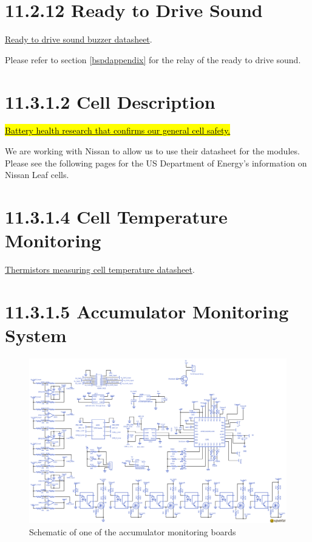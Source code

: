 \documentclass{article}
\DeclareRobustCommand{\hlr}[1]{{\sethlcolor{red}\hl{#1}}}
\begin{document}
{\section*{11.2.12 Ready to Drive Sound} \label{r2dappendix}

\href{http://www.mouser.com/ds/2/252/SC648ANR-63353.pdf}{Ready to drive sound buzzer datasheet}.

Please refer to section \ref{bspdappendix} for the relay of the ready to drive sound.

\section*{11.3.1.2 Cell Description}
\href{http://batteryuniversity.com/learn/article/discharge_methods}{\hlr{Battery health research that confirms our general cell safety.}}

We are working with Nissan to allow us to use their datasheet for the modules. Please see the following pages for the US Department of Energy's information on Nissan Leaf cells.



\section*{11.3.1.4 Cell Temperature Monitoring}

\href{http://media.digikey.com/PDF/Data\%20Sheets/Ametherm\%20PDFs/PANR\%20103395-408.pdf}{Thermistors measuring cell temperature datasheet}.

\section*{11.3.1.5 Accumulator Monitoring System}  \label{amsappendix}

\begin{figure}
    \centering
    \includegraphics[width = 1 \textwidth]{BMS_Schem}
    \caption{Schematic of one of the accumulator monitoring boards}
    \label{amsschem}
\end{figure}

}
\end{document}

